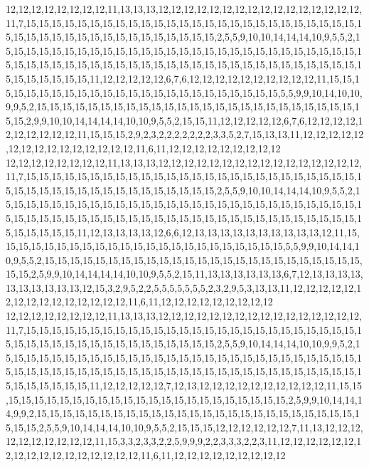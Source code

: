 12,12,12,12,12,12,12,12,11,13,13,13,12,12,12,12,12,12,12,12,12,12,12,12,12,12,12,12,11,7,15,15,15,15,15,15,15,15,15,15,15,15,15,15,15,15,15,15,15,15,15,15,15,15,15,15,15,15,15,15,15,15,15,15,15,15,15,15,15,15,15,15,15,2,5,5,9,10,10,14,14,14,10,9,5,5,2,15,15,15,15,15,15,15,15,15,15,15,15,15,15,15,15,15,15,15,15,15,15,15,15,15,15,15,15,15,15,15,15,15,15,15,15,15,15,15,15,15,15,15,15,15,15,15,15,15,15,15,15,15,15,15,15,15,15,15,15,15,15,15,11,12,12,12,12,12,6,7,6,12,12,12,12,12,12,12,12,12,12,11,15,15,15,15,15,15,15,15,15,15,15,15,15,15,15,15,15,15,15,15,15,15,15,15,5,5,9,9,10,14,10,10,9,9,5,2,15,15,15,15,15,15,15,15,15,15,15,15,15,15,15,15,15,15,15,15,15,15,15,15,15,15,15,2,9,9,10,10,14,14,14,14,10,10,9,5,5,2,15,15,11,12,12,12,12,12,6,7,6,12,12,12,12,12,12,12,12,12,12,11,15,15,15,2,9,2,3,2,2,2,2,2,2,2,3,3,5,2,7,15,13,13,11,12,12,12,12,12,12,12,12,12,12,12,12,12,12,12,11,6,11,12,12,12,12,12,12,12,12,12
12,12,12,12,12,12,12,12,11,13,13,13,12,12,12,12,12,12,12,12,12,12,12,12,12,12,12,12,11,7,15,15,15,15,15,15,15,15,15,15,15,15,15,15,15,15,15,15,15,15,15,15,15,15,15,15,15,15,15,15,15,15,15,15,15,15,15,15,15,15,15,15,15,2,5,5,9,10,10,14,14,14,10,9,5,5,2,15,15,15,15,15,15,15,15,15,15,15,15,15,15,15,15,15,15,15,15,15,15,15,15,15,15,15,15,15,15,15,15,15,15,15,15,15,15,15,15,15,15,15,15,15,15,15,15,15,15,15,15,15,15,15,15,15,15,15,15,15,15,11,12,13,13,13,13,12,6,6,12,13,13,13,13,13,13,13,13,13,13,12,11,15,15,15,15,15,15,15,15,15,15,15,15,15,15,15,15,15,15,15,15,15,15,15,5,5,9,9,10,14,14,10,9,5,5,2,15,15,15,15,15,15,15,15,15,15,15,15,15,15,15,15,15,15,15,15,15,15,15,15,15,15,15,2,5,9,9,10,14,14,14,14,10,10,9,5,5,2,15,11,13,13,13,13,13,13,6,7,12,13,13,13,13,13,13,13,13,13,13,12,15,3,2,9,5,2,2,5,5,5,5,5,5,5,2,3,2,9,5,3,13,13,11,12,12,12,12,12,12,12,12,12,12,12,12,12,12,12,11,6,11,12,12,12,12,12,12,12,12,12
12,12,12,12,12,12,12,12,11,13,13,13,12,12,12,12,12,12,12,12,12,12,12,12,12,12,12,12,11,7,15,15,15,15,15,15,15,15,15,15,15,15,15,15,15,15,15,15,15,15,15,15,15,15,15,15,15,15,15,15,15,15,15,15,15,15,15,15,15,15,15,15,15,2,5,5,9,10,14,14,14,10,10,9,9,5,2,15,15,15,15,15,15,15,15,15,15,15,15,15,15,15,15,15,15,15,15,15,15,15,15,15,15,15,15,15,15,15,15,15,15,15,15,15,15,15,15,15,15,15,15,15,15,15,15,15,15,15,15,15,15,15,15,15,15,15,15,15,15,15,11,12,12,12,12,12,7,12,13,12,12,12,12,12,12,12,12,12,12,11,15,15,15,15,15,15,15,15,15,15,15,15,15,15,15,15,15,15,15,15,15,15,15,15,2,5,9,9,10,14,14,14,9,9,2,15,15,15,15,15,15,15,15,15,15,15,15,15,15,15,15,15,15,15,15,15,15,15,15,15,15,15,15,2,5,5,9,10,14,14,14,10,10,9,5,5,2,15,15,15,12,12,12,12,12,12,7,11,13,12,12,12,12,12,12,12,12,12,12,11,15,3,3,2,3,3,2,2,5,9,9,9,2,2,3,3,3,2,2,3,11,12,12,12,12,12,12,12,12,12,12,12,12,12,12,12,12,12,11,6,11,12,12,12,12,12,12,12,12,12
